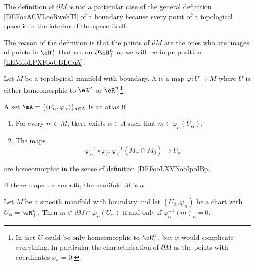 \begin{normaltext}
	The definition of \( \partial M\) is not a particular case of the general definition \ref{DEFooACVLooRwehTl} of a boundary because every point of a topological space is in the interior of the space itself.

	The reason of the definition is that the points of \( \partial M\) are the ones who are images of points in \( \eR^n_+\) that are on \( \partial \eR^n_+\) as we will see in proposition \ref{LEMooLPXFooUBLCqA}.
\end{normaltext}


\begin{theorem}	\label{THOooKKBLooIrITBe}
	Let \( M\) be a topological manifold with boundary. A  is a map \(\varphi \colon U\to M  \) where \( U\) is either homeomorphic to \( \eR^n\) or \( \eR^n_+\)\footnote{In fact \( U\) could be only homeomorphic to \( \eR^n_+\), but it would complicate everything. In particular the characterisation of \( \partial M\) as the points with coordinates \( x_n=0\).}

	A set \( \mA=\{ (U_{\alpha},\varphi_{\alpha}) \}_{\alpha\in \Lambda}\) is an atlas if
	\begin{enumerate}
		\item
		      For every \( m\in M\), there exists \( \alpha\in \Lambda\) such that \( m\in \varphi_{\alpha}(U_{\alpha})\),
		\item
		      The maps
		      \begin{equation}
			      \varphi_{\alpha}^{-1}\circ\varphi_{\beta} \colon \varphi_{\beta}^{-1}(M_{\alpha}\cap M_{\beta})\to U_{\alpha}
		      \end{equation}
	\end{enumerate}
	are homeomorphic in the sense of definition \ref{DEFooLXVNooIpoIBp}.

	If these maps are smooth, the manifold \( M\) is a .
\end{theorem}


\begin{proposition}	\label{PROPooWQHTooXhkWdZ}
	Let \( M\) be a smooth manifold with boundary and let \( (U_{\alpha}, \varphi_{\alpha})\) be a chart with \( U_{\alpha}=\eR^n_+\). Then \( m\in \partial M\cap \varphi_{\alpha}(U_{\alpha})\) if and only if \( \varphi_{\alpha}^{-1}(m)_n=0\).
\end{proposition}


